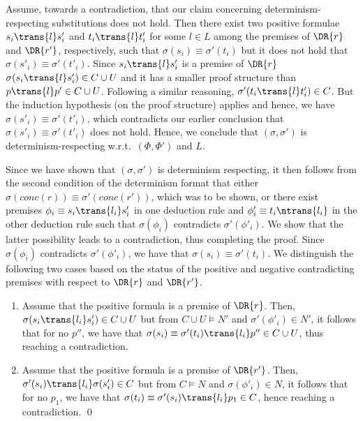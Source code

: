 Assume,  towards a contradiction, that our claim concerning determinism-respecting substitutions does not hold.
Then there exist  two positive formulae $s_i \trans{l} s'_i$ and $t_i \trans{l} t'_i$ for some $l \in L$ among the premises of $\DR{r}$ and
$\DR{r'}$, respectively, such that
$\sigma(s_i) \equiv \sigma'(t_i)$ but it does not hold that $\sigma(s'_i) \equiv \sigma'(t'_i)$.
Since $s_i \trans{l} s'_i$  is a premise of $\DR{r}$ $\sigma(s_i \trans{l} s'_i) \in C \cup U$ and it has a smaller proof structure than $p \trans{l} p' \in C \cup U$. Following a similar reasoning, $\sigma'(t_i \trans{l} t'_i) \in C$.
But the induction hypothesis (on the proof structure) applies and hence, we have $\sigma(s'_i) \equiv \sigma'(t'_i)$, which contradicts our earlier conclusion that $\sigma(s'_i) \equiv \sigma'(t'_i)$ does not hold. Hence, we conclude that  $(\sigma, \sigma')$ is determinism-respecting w.r.t.\ $(\Phi, \Phi')$ and $L$.

Since we have shown that $(\sigma, \sigma')$ is determinism respecting,
it then follows from the second condition of the determinism format that either $\sigma(conc(r)) \equiv \sigma'(conc(r'))$,
which was to be shown, or
there exist premises $\phi_i \equiv s_i \trans{l_i} s'_i$  in one deduction rule and
$\phi'_i \equiv t_i \ntrans{l_i}$ in the other deduction rule such that
$\sigma(\phi_i)$ contradicts $\sigma'(\phi'_i)$.
We show that the latter possibility leads to a contradiction, thus completing the proof.
Since $\sigma(\phi_i)$ contradicts $\sigma'(\phi'_i)$, we have that $\sigma(s_i) \equiv \sigma'(t_i)$.
We distinguish the following two cases based on the status of the positive and negative contradicting premises with respect to $\DR{r}$ and $\DR{r'}$.

\begin{enumerate}
\item
Assume that the positive formula is a premise of $\DR{r}$.
Then, $\sigma(s_i \trans{l_i} s'_i) \in C \cup U$ but  from $C \cup U \vDash N'$ and $\sigma'(\phi'_i) \in N'$, it follows that
for no $p''$, we have that $\sigma(s_i) \equiv \sigma'(t_i) \trans{l_i} p'' \in C \cup U$, thus reaching a contradiction.

\item
Assume that the positive formula is a premise of $\DR{r'}$.
Then, $\sigma'(s_i) \trans{l_i} \sigma(s'_i) \in C$ but from $C \vDash N$ and $\sigma(\phi'_i) \in N$, it follows that
for no $p_1$, we have that $\sigma(t_i) \equiv \sigma'(s_i) \trans{l_i} p_1 \in C$, hence reaching a contradiction. \hfill\qed
\end{enumerate}

